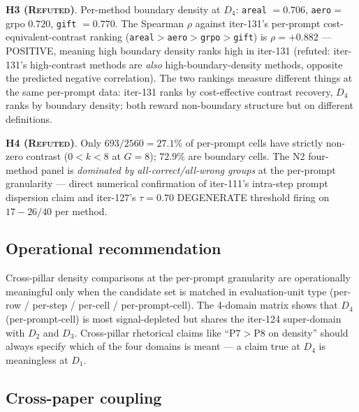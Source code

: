\textbf{H3 (\textsc{Refuted})}. Per-method boundary density at
$D_4$: \texttt{areal} $= 0.706$, \texttt{aero}${}={}$grpo
$0.720$, \texttt{gift} $= 0.770$. The Spearman $\rho$ against
iter-131's per-prompt cost-equivalent-contrast ranking
(\texttt{areal}${}>$\texttt{aero}${}>$\texttt{grpo}${}>$\texttt{gift})
is $\rho = +0.882$ — POSITIVE, meaning high boundary density ranks
high in iter-131 (refuted: iter-131's high-contrast methods are
\emph{also} high-boundary-density methods, opposite the predicted
negative correlation). The two rankings measure different things at
the same per-prompt data: iter-131 ranks by cost-effective contrast
recovery, $D_4$ ranks by boundary density; both reward
non-boundary structure but on different definitions.

\textbf{H4 (\textsc{Refuted})}. Only $693 / 2560 = 27.1\%$ of
per-prompt cells have strictly non-zero contrast ($0 < k < 8$ at
$G{=}8$); $72.9\%$ are boundary cells. The N2 four-method panel is
\emph{dominated by all-correct/all-wrong groups} at the per-prompt
granularity — direct numerical confirmation of iter-111's
intra-step prompt dispersion claim and iter-127's $\tau{=}0.70$
DEGENERATE threshold firing on $17{-}26/40$ per method.

\subsection{Operational recommendation}

Cross-pillar density comparisons at the per-prompt granularity are
operationally meaningful only when the candidate set is matched in
evaluation-unit type (per-row / per-step / per-cell / per-prompt-cell).
The 4-domain matrix shows that $D_4$ (per-prompt-cell) is most
signal-depleted but shares the iter-124 super-domain with $D_2$ and $D_3$.
Cross-pillar rhetorical claims like ``$\mathrm{P7} > \mathrm{P8}$ on
density'' should always specify which of the four domains is meant —
a claim true at $D_4$ is meaningless at $D_1$.

\subsection{Cross-paper coupling}

